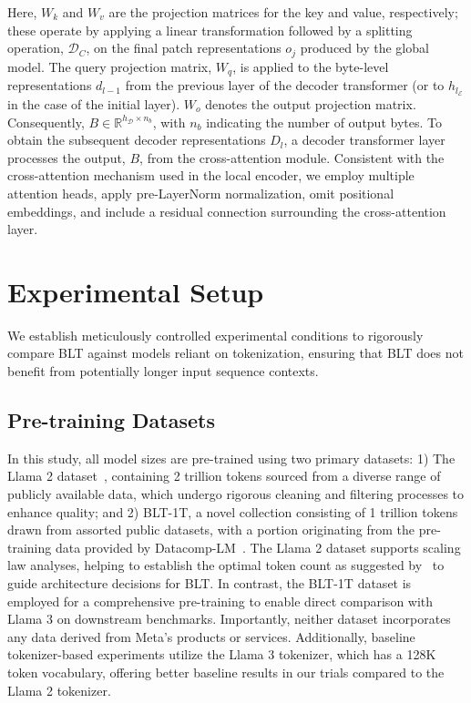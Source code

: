 Here, $W_k$ and $W_v$ are the projection matrices for the key and value, respectively; these operate by applying a linear transformation followed by a splitting operation, $\mathcal{D}_C$, on the final patch representations $o_j$ produced by the global model. The query projection matrix, $W_q$, is applied to the byte-level representations $d_{l-1}$ from the previous layer of the decoder transformer (or to $h_{l_{\mathcal{E}}}$ in the case of the initial layer). $W_o$ denotes the output projection matrix. Consequently, $B \in \mathbb{R}^{h_{\mathcal{D}} \times n_b}$, with $n_b$ indicating the number of output bytes. To obtain the subsequent decoder representations $D_l$, a decoder transformer layer processes the output, $B$, from the cross-attention module. Consistent with the cross-attention mechanism used in the local encoder, we employ multiple attention heads, apply pre-LayerNorm normalization, omit positional embeddings, and include a residual connection surrounding the cross-attention layer.

\section{Experimental Setup}
\label{section:experiments}
We establish meticulously controlled experimental conditions to rigorously compare {\textsc BLT} against models reliant on tokenization, ensuring that {\textsc BLT} does not benefit from potentially longer input sequence contexts.

\subsection{Pre-training Datasets} In this study, all model sizes are pre-trained using two primary datasets: 1) The Llama 2 dataset~\citep{touvron2023llama}, containing 2 trillion tokens sourced from a diverse range of publicly available data, which undergo rigorous cleaning and filtering processes to enhance quality; and 2) {\textsc BLT}-1T, a novel collection consisting of 1 trillion tokens drawn from assorted public datasets, with a portion originating from the pre-training data provided by Datacomp-LM~\citep{li2024datacomp}. The Llama 2 dataset supports scaling law analyses, helping to establish the optimal token count as suggested by~\cite{dubey2024llama} to guide architecture decisions for {\textsc BLT}. In contrast, the {\textsc BLT}-1T dataset is employed for a comprehensive pre-training to enable direct comparison with Llama 3 on downstream benchmarks. Importantly, neither dataset incorporates any data derived from Meta’s products or services. Additionally, baseline tokenizer-based experiments utilize the Llama 3 tokenizer, which has a 128K token vocabulary, offering better baseline results in our trials compared to the Llama 2 tokenizer.


